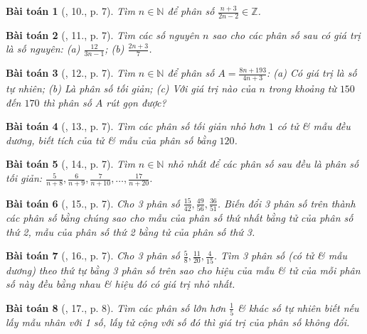 \documentclass{article}
\newtheorem{baitoan}{Bài toán}
\begin{document}
\begin{baitoan}[\cite{Binh_Toan_6_tap_2}, 10., p. 7]
	Tìm $n\in\mathbb{N}$ để phân số $\frac{n + 3}{2n - 2}\in\mathbb{Z}$.
\end{baitoan}

\begin{baitoan}[\cite{Binh_Toan_6_tap_2}, 11., p. 7]
	Tìm các số nguyên $n$ sao cho các phân số sau có giá trị là số nguyên: (a) $\frac{12}{3n - 1}$; (b) $\frac{2n + 3}{7}$.
\end{baitoan}

\begin{baitoan}[\cite{Binh_Toan_6_tap_2}, 12., p. 7]
	Tìm $n\in\mathbb{N}$ để phân số $A = \frac{8n + 193}{4n + 3}$: (a) Có giá trị là số tự nhiên; (b) Là phân số tối giản; (c) Với giá trị nào của $n$ trong khoảng từ $150$ đến $170$ thì phân số $A$ rút gọn được?
\end{baitoan}

\begin{baitoan}[\cite{Binh_Toan_6_tap_2}, 13., p. 7]
	Tìm các phân số tối giản nhỏ hơn $1$ có tử \& mẫu đều dương, biết tích của tử \& mẫu của phân số bằng $120$.
\end{baitoan}

\begin{baitoan}[\cite{Binh_Toan_6_tap_2}, 14., p. 7]
	Tìm $n\in\mathbb{N}$ nhỏ nhất để các phân số sau đều là phân số tối giản: $\frac{5}{n + 8},\frac{6}{n + 9},\frac{7}{n + 10},\ldots,\frac{17}{n + 20}$.
\end{baitoan}

\begin{baitoan}[\cite{Binh_Toan_6_tap_2}, 15., p. 7]
	Cho 3 phân số $\frac{15}{42},\frac{49}{56},\frac{36}{51}$. Biến đổi 3 phân số trên thành các phân số bằng chúng sao cho mẫu của phân số thứ nhất bằng tử của phân số thứ 2, mẫu của phân số thứ 2 bằng tử của phân số thứ 3.
\end{baitoan}

\begin{baitoan}[\cite{Binh_Toan_6_tap_2}, 16., p. 7]
	Cho 3 phân số $\frac{5}{8},\frac{11}{20},\frac{4}{15}$. Tìm 3 phân số (có tử \& mẫu dương) theo thứ tự bằng 3 phân số trên sao cho hiệu của mẫu \& tử của mỗi phân số này đều bằng nhau \& hiệu đó có giá trị nhỏ nhất.
\end{baitoan}

\begin{baitoan}[\cite{Binh_Toan_6_tap_2}, 17., p. 8]
	Tìm các phân số lớn hơn $\frac{1}{5}$ \& khác số tự nhiên biết nếu lấy mẫu nhân với 1 số, lấy tử cộng với số đó thì giá trị của phân số không đổi.
\end{baitoan}
\end{document}
